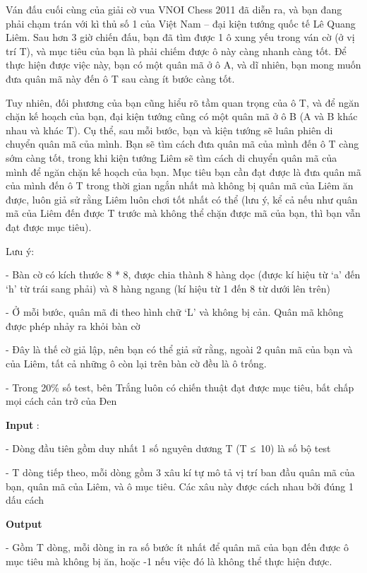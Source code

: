 



   Ván đấu cuối cùng của giải cờ vua VNOI Chess 2011 đã diễn ra, và bạn đang phải chạm trán với kì thủ số 1 của Việt Nam – đại kiện tướng quốc tế Lê Quang Liêm. Sau hơn 3 giờ chiến đấu, bạn đã tìm được 1 ô xung yếu trong ván cờ (ở vị trí T), và mục tiêu của bạn là phải chiếm được ô này càng nhanh càng tốt. Để thực hiện được việc này, bạn có một quân mã ở ô A, và dĩ nhiên, bạn mong muốn đưa quân mã này đến ô T sau càng ít bước càng tốt.  

   Tuy nhiên, đối phương của bạn cũng hiểu rõ tầm quan trọng của ô T, và để ngăn chặn kế hoạch của bạn, đại kiện tướng cũng có một quân mã ở ô B (A và B khác nhau và khác T). Cụ thể, sau mỗi bước, bạn và kiện tướng sẽ luân phiên di chuyển quân mã của mình. Bạn sẽ tìm cách đưa quân mã của mình đến ô T càng sớm càng tốt, trong khi kiện tướng Liêm sẽ tìm cách di chuyển quân mã của mình để ngăn chặn kế hoạch của bạn. Mục tiêu bạn cần đạt được là đưa quân mã của mình đến ô T trong thời gian ngắn nhất   mà không bị quân mã của Liêm ăn được, luôn giả sử rằng Liêm luôn chơi tốt nhất có thể   (lưu ý, kể cả nếu như quân mã của Liêm đến được T trước mà không thể chặn được mã của bạn, thì bạn vẫn đạt được mục tiêu).  

   Lưu ý:  

   - Bàn cờ có kích thước 8 * 8, được chia thành 8 hàng dọc (được kí hiệu từ ‘a’ đến ‘h’ từ trái sang phải) và 8 hàng ngang (kí hiệu từ 1 đến 8 từ dưới lên trên)  

   - Ở mỗi bước, quân mã đi theo hình chữ ‘L’ và không bị cản. Quân mã không được phép nhảy ra khỏi bàn cờ  

   - Đây là thế cờ giả lập, nên bạn có thể giả sử rằng, ngoài 2 quân mã của bạn và của Liêm, tất cả những ô còn lại trên bàn cờ đều là ô trống.  

   - Trong 20\% số test, bên Trắng luôn có chiến thuật đạt được mục tiêu, bất chấp mọi cách cản trở của Đen  

\textbf{    Input   }   :  

   - Dòng đầu tiên gồm duy nhất 1 số nguyên dương T (T ≤ 10) là số bộ test  

   - T dòng tiếp theo, mỗi dòng gồm 3 xâu kí tự mô tả vị trí ban đầu quân mã của bạn, quân mã của Liêm, và ô mục tiêu. Các xâu này được cách nhau bởi đúng 1 dấu cách  

\textbf{    Output   }

   - Gồm T dòng, mỗi dòng in ra số bước ít nhất để quân mã của bạn đến được ô mục tiêu mà không bị ăn, hoặc -1 nếu việc đó là không thể thực hiện được.  

